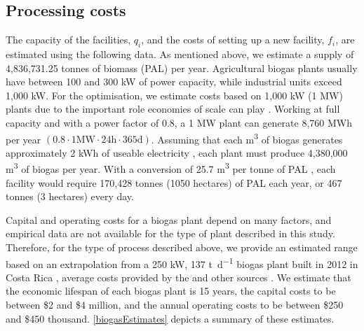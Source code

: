 \subsection{Processing costs}
\label{costsch4}
The capacity of the facilities, $q_i$, and the costs of setting up a new facility, $f_i$, are estimated using the following data. As mentioned above, we estimate a supply of 4,836,731.25 tonnes of biomass (PAL) per year. Agricultural biogas plants usually have between 100 and 300 kW of power capacity, while industrial units exceed 1,000 kW. For the optimisation, we estimate costs based on 1,000 kW (1 MW) plants due to the important role economies of scale can play \citep{walla2008optimal, pinas2019economic}. Working at full capacity and with a power factor of 0.8, a 1 MW plant can generate 8,760 MWh per year $(0.8 \cdot 1 \si{\MW} \cdot 24 \si{\hour} \cdot 365 \si{\day})$. Assuming that each \si{\meter\cubed} of biogas generates approximately 2 kWh of useable electricity \citep{uddin2016biogas,suhartini2019estimation,swedishBio}, each plant must produce 4,380,000 \si{\meter\cubed} of biogas per year. With a conversion of 25.7 \si{\meter\cubed} per tonne of PAL \citep{arce2014determinacion}, each facility would require 170,428 tonnes (1050 hectares) of PAL each year, or 467 tonnes (3 hectares) every day. 

Capital and operating costs for a biogas plant depend on many factors, and empirical data are not available for the type of plant described in this study. Therefore, for the type of process described above, we provide an estimated range based on an extrapolation from a 250 kW, 137 \si{\tonne \per \day} biogas plant built in 2012 in Costa Rica \citep{sigmaanalysis}, average costs provided by the \citeauthor{ieaBio} and other sources \citep{salerno2017costs, obileke2022economic, newsGuatemala, newsSalvador, ICEbiogas, walla2008optimal}. We estimate that the economic lifespan of each biogas plant is 15 years, the capital costs to be between \$2 and \$4 million, and the annual operating costs to be between \$250 and \$450 thousand. \cref{biogasEstimates} depicts a summary of these estimates. 


